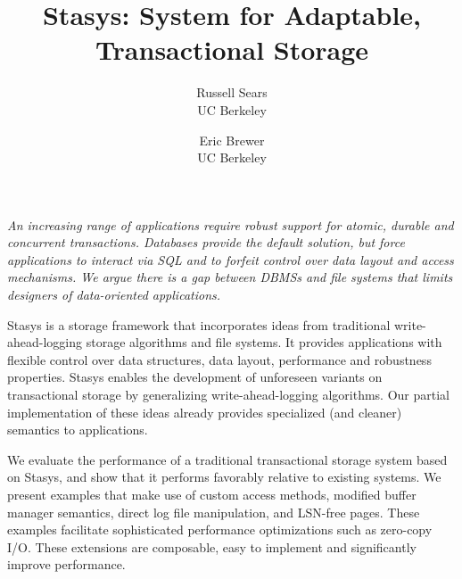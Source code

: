 \documentclass[letterpaper,twocolumn,10pt]{article}
\newcommand{\yad}{Stasys\xspace}
\begin{document}
\date{}


\title{\Large \bf \yad: System for Adaptable, Transactional Storage}

\author{
{\rm Russell Sears}\\
UC Berkeley
\and
{\rm Eric Brewer}\\
UC Berkeley
} %

\maketitle




{\em An increasing range of applications require robust support for atomic, durable and concurrent
transactions.  Databases provide the default solution, but force
applications to interact via SQL and to forfeit control over data
layout and access mechanisms.  We argue there is a gap between DBMSs and file systems that limits designers of data-oriented applications.

\yad is a storage framework that incorporates ideas from traditional
write-ahead-logging storage algorithms and file systems.
It provides applications with flexible control over data structures, data layout, performance and robustness properties.
\yad enables the development of
unforeseen variants on transactional storage by generalizing
write-ahead-logging algorithms.  Our partial implementation of these
ideas already provides specialized (and cleaner) semantics to applications.

We evaluate the performance of a traditional transactional storage
system based on \yad, and show that it performs favorably relative to existing
systems.  We present examples that make use of custom access methods, modified
buffer manager semantics, direct log file manipulation, and LSN-free
pages.  These examples facilitate sophisticated performance 
optimizations such as zero-copy I/O.  These extensions are composable,
easy to implement and significantly improve performance.

}
\end{document}
